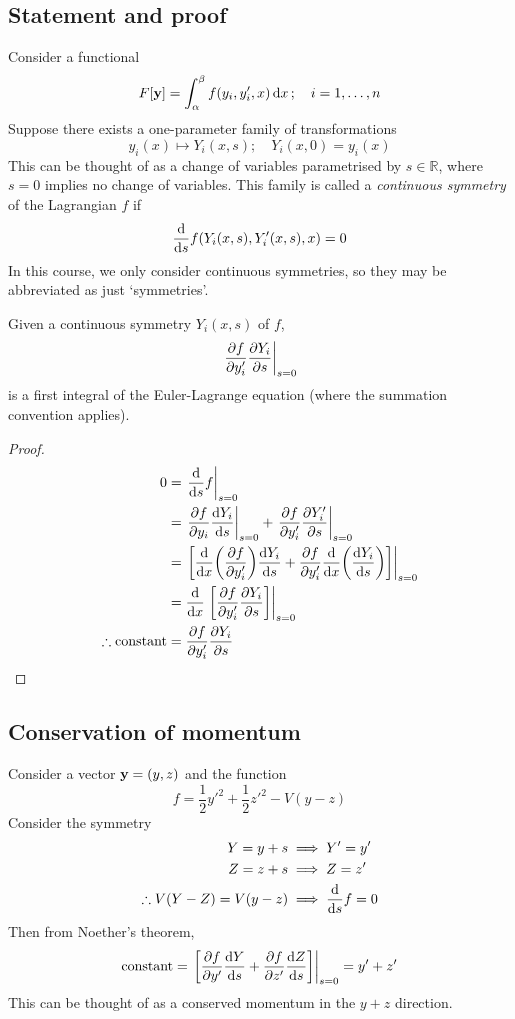 \subsection{Statement and proof}
Consider a functional
\[
	F[\vb y] = \int_\alpha^\beta f(y_i, y_i', x) \dd{x};\quad i = 1,\dots,n
\]
Suppose there exists a one-parameter family of transformations
\[
	y_i(x) \mapsto Y_i(x,s);\quad Y_i(x,0) = y_i(x)
\]
This can be thought of as a change of variables parametrised by \( s \in \mathbb R \), where \( s = 0 \) implies no change of variables.
This family is called a \textit{continuous symmetry} of the Lagrangian \( f \) if
\[
	\dv{s} f(Y_i(x,s), Y_i'(x,s), x) = 0
\]
In this course, we only consider continuous symmetries, so they may be abbreviated as just `symmetries'.
\begin{theorem}
	Given a continuous symmetry \( Y_i(x,s) \) of \( f \),
	\[
		\eval{\pdv{f}{y_i'}\pdv{Y_i}{s}}_{s=0}
	\]
	is a first integral of the Euler-Lagrange equation (where the summation convention applies).
\end{theorem}
\begin{proof}
	\begin{align*}
		0                          & = \eval{\dv{s} f}_{s=0}                                                                           \\
		                           & = \eval{\pdv{f}{y_i} \dv{Y_i}{s}}_{s=0} + \eval{\pdv{f}{y_i'}\pdv{Y_i'}{s}}_{s=0}                 \\
		                           & = \eval{\qty[\dv{x} \qty(\pdv{f}{y_i'})\dv{Y_i}{s} + \pdv{f}{y_i'}\dv{x}\qty(\dv{Y_i}{s})]}_{s=0} \\
		                           & = \dv{x}\eval{\qty[\pdv{f}{y_i'}\pdv{Y_i}{s}]}_{s=0}                                              \\
		\therefore \text{constant} & = \pdv{f}{y_i'}\pdv{Y_i}{s}
	\end{align*}
\end{proof}

\subsection{Conservation of momentum}
\begin{example}
	Consider a vector \( \vb y = (y,z) \) and the function
	\[
		f = \frac{1}{2}y'^2 + \frac{1}{2}z'^2 - V(y-z)
	\]
	Consider the symmetry
	\begin{align*}
		Y = y + s                  & \implies Y' = y'      \\
		Z = z + s                  & \implies Z = z'       \\
		\therefore V(Y-Z) = V(y-z) & \implies \dv{s} f = 0
	\end{align*}
	Then from Noether's theorem,
	\[
		\text{constant} = \eval{\qty[\pdv{f}{y'}\dv{Y}{s} + \pdv{f}{z'}\dv{Z}{s}]}_{s=0} = y' + z'
	\]
	This can be thought of as a conserved momentum in the \(y+z\) direction.
\end{example}

